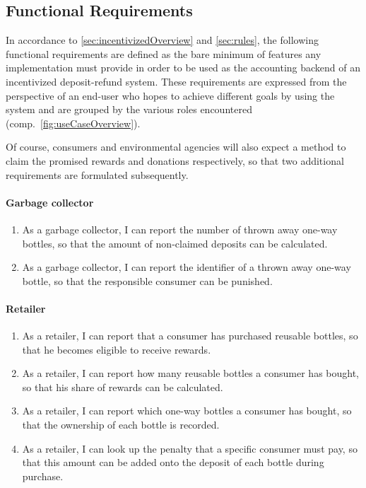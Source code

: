 \def\twodigits#1{%
  \ifnum#1<10 0\fi
  \number#1}

\subsection{Functional Requirements}
\label{sec:FRs}
In accordance to \autoref{sec:incentivizedOverview} and \autoref{sec:rules}, the following functional requirements are defined as the bare minimum of features any implementation must provide in order to be used as the accounting backend of an incentivized deposit-refund system. These requirements are expressed from the perspective of an end-user who hopes to achieve different goals by using the system and are grouped by the various roles encountered (comp.~\autoref{fig:useCaseOverview}).

Of course, consumers and environmental agencies will also expect a method to claim the promised rewards and donations respectively, so that two additional requirements are formulated subsequently.

\paragraph{Garbage collector}
\begin{enumerate}[font=\sffamily,label={\textbf{FR-\protect\twodigits{\theenumi}}},leftmargin=1.4cm, ref=FR-\protect\twodigits{\theenumi}]
	\item As a garbage collector, I can report the number of thrown away one-way bottles, so that the amount of non-claimed deposits can be calculated. \label{itm:reportNumber}
	\item As a garbage collector, I can report the identifier of a thrown away one-way bottle, so that the responsible consumer can be punished. \label{itm:reportIdentifier}
\end{enumerate}

\paragraph{Retailer}
\begin{enumerate}[resume, font=\sffamily, label={\textbf{FR-\protect\twodigits{\theenumi}}},leftmargin=1.4cm, ref=FR-\protect\twodigits{\theenumi}]
	\item As a retailer, I can report that a consumer has purchased reusable bottles, so that he becomes eligible to receive rewards. \label{itm:reportReusablePurchase}
	\item As a retailer, I can report how many reusable bottles a consumer has bought, so that his share of rewards can be calculated. \label{itm:reportReusableNumber}
	\item As a retailer, I can report which one-way bottles a consumer has bought, so that the ownership of each bottle is recorded. \label{itm:reportOneWays}
	\item As a retailer, I can look up the penalty that a specific consumer must pay, so that this amount can be added onto the deposit of each bottle during purchase. \label{itm:lookUpPenalty}
\end{enumerate}

